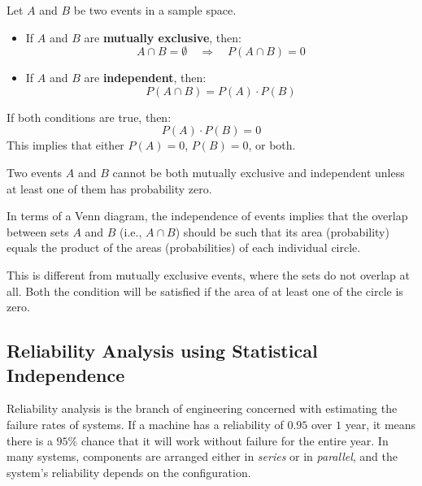 \documentclass[twoside]{book}
\begin{document}
Let \( A \) and \( B \) be two events in a sample space.

\begin{itemize}
    \item If \( A \) and \( B \) are \textbf{mutually exclusive}, then:
    \[
    A \cap B = \emptyset \quad \Rightarrow \quad P(A \cap B) = 0
    \]
    \item If \( A \) and \( B \) are \textbf{independent}, then:
    \[
    P(A \cap B) = P(A) \cdot P(B)
    \]
\end{itemize}

If both conditions are true, then:
\[
P(A) \cdot P(B) = 0
\]
This implies that either \( P(A) = 0 \), \( P(B) = 0 \), or both.

\begin{textbox}
Two events \( A \) and \( B \) cannot be both mutually exclusive and independent unless at least one of them has probability zero.
\end{textbox}


In terms of a Venn diagram, the independence of events implies that the overlap between sets \( A \) and \( B \) (i.e., \( A \cap B \)) should be such that its area (probability) equals the product of the areas (probabilities) of each individual circle.

\begin{center}
\end{center}

This is different from mutually exclusive events, where the sets do not overlap at all. Both the condition will be satisfied if the area of at least one of the circle is zero.

\subsection{Reliability Analysis using Statistical Independence}

Reliability analysis is the branch of engineering concerned with estimating the failure
rates of systems. If a machine has a reliability of $0.95$ over $1$ year, it means there is a $95\%$ chance that it will work without failure for the entire year. In many systems, components are arranged either in \textit{series} or in \textit{parallel}, and the system's reliability depends on the configuration.
\end{document}
